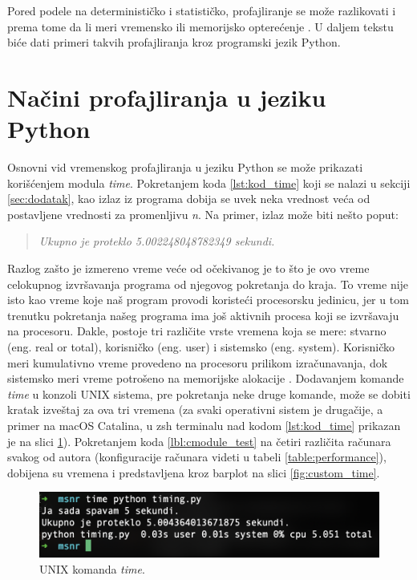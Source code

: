 \documentclass[a4paper]{article}
\begin{document}
Pored podele na determinističko i statističko, profajliranje se može razlikovati i prema tome da li meri vremensko ili memorijsko opterećenje \cite{lanaro2013python}. U daljem tekstu biće dati primeri takvih profajliranja kroz programski jezik Python. 

\section{Načini profajliranja u jeziku Python}	
\label{sec:profajleri_u_pythonu}
Osnovni vid vremenskog profajliranja u jeziku Python se može prikazati korišćenjem modula {\em time}. Pokretanjem koda \ref{lst:kod_time} koji se nalazi u sekciji \ref{sec:dodatak}, kao izlaz iz programa dobija se uvek neka vrednost veća od postavljene vrednosti za promenljivu {\em n}. Na primer, izlaz može biti nešto poput:

\begin{quote}
    {\em Ukupno je proteklo 5.002248048782349 sekundi.}
\end{quote}
Razlog zašto je izmereno vreme veće od očekivanog je to što je ovo vreme celokupnog izvršavanja programa od njegovog pokretanja do kraja. To vreme nije isto kao vreme koje naš program provodi koristeći procesorsku jedinicu, jer u tom trenutku pokretanja našeg programa ima još aktivnih procesa koji se izvršavaju na procesoru. Dakle, postoje tri različite vrste vremena koja se mere: stvarno (eng. real or total), korisničko (eng. user) i sistemsko (eng. system). Korisničko meri kumulativno vreme provedeno na procesoru prilikom izračunavanja, dok sistemsko meri vreme potrošeno na memorijske alokacije \cite{lanaro2013python}. Dodavanjem komande {\em time} u konzoli UNIX sistema, pre pokretanja neke druge komande, može se dobiti kratak izveštaj za ova tri vremena (za svaki operativni sistem je drugačije, a primer na macOS Catalina, u zsh terminalu nad kodom \ref{lst:kod_time} prikazan je na slici \ref{fig:time_shell}). Pokretanjem koda \ref{lbl:cmodule_test} na četiri različita računara svakog od autora (konfiguracije računara videti u tabeli \ref{table:performance}), dobijena su vremena i predstavljena kroz barplot na slici \ref{fig:custom_time}.

\begin{figure}[h!]
\begin{center}
\includegraphics[scale=0.6]{MVJ_02_ProfajleriZaPython_ZecevicSmiljanicMilovanovicPopov/time_python_shell.png}
\end{center}
\caption{UNIX komanda {\em time}.}
\label{fig:time_shell}
\end{figure}
\end{document}
